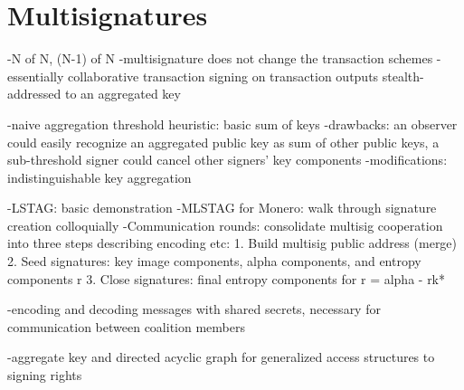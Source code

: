 \chapter{Multisignatures}
\label{chapter:multisignatures}

-N of N, (N-1) of N
-multisignature does not change the transaction schemes
-essentially collaborative transaction signing on transaction outputs stealth-addressed to an aggregated key


-naive aggregation threshold heuristic: basic sum of keys
    -drawbacks: an observer could easily recognize an aggregated public key as sum of other public keys, a sub-threshold signer could cancel other signers' key components
    -modifications: indistinguishable key aggregation

-LSTAG: basic demonstration
-MLSTAG for Monero: walk through signature creation colloquially
-Communication rounds: consolidate multisig cooperation into three steps describing encoding etc:
    1. Build multisig public address (merge)
    2. Seed signatures: key image components, alpha components, and entropy components r
    3. Close signatures: final entropy components for r = alpha - rk*
    
-encoding and decoding messages with shared secrets, necessary for communication between coalition members

-aggregate key and directed acyclic graph for generalized access structures to signing rights